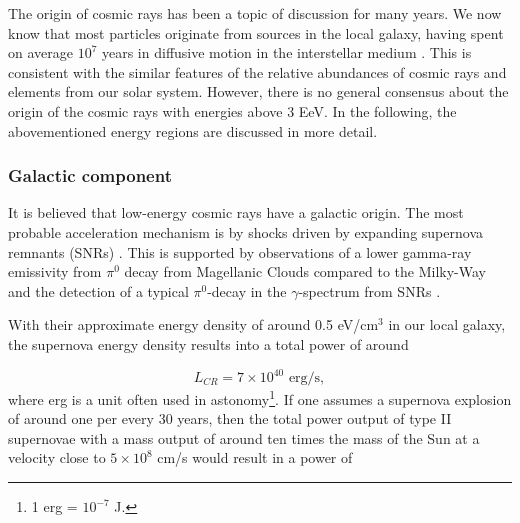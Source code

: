 The origin of cosmic rays has been a topic of discussion for many years. We now know that most particles originate from sources in the local galaxy, having spent on average $10^7$ years in diffusive motion in the interstellar medium \cite{Gaisser:2013bla}. This is consistent with the similar features of the relative abundances of cosmic rays and elements from our solar system. However, there is no general consensus about the origin of the cosmic rays with energies above 3 EeV. In the following, the abovementioned energy regions are discussed in more detail.




\subsubsection{Galactic component}
\label{subsubsec:galactic}
It is believed that low-energy cosmic rays have a galactic origin. The most probable acceleration mechanism is by shocks driven by expanding supernova remnants (SNRs) \cite{0034-4885-64-4-201}. This is supported by observations of a lower gamma-ray emissivity from $\pi^0$ decay from Magellanic Clouds compared to the Milky-Way \cite{Fermi-LAT:2010fcp} and the detection of a typical $\pi^0$-decay in the $\gamma$-spectrum from SNRs \cite{Ackermann:2013wqa}. 

With their approximate energy density of around 0.5 eV/cm$^3$ in our local galaxy, the supernova energy density results into a total power of around

\begin{equation}
L_{CR} = 7 \times 10^{40} \textrm{ erg/s},
\end{equation}
where erg is a unit often used in astonomy\footnote{1 erg = $10^{-7}$ J.}. If one assumes a supernova explosion of around one per every 30 years, then the total power output of type II supernovae with a mass output of around ten times the mass of the Sun at a velocity close to $5 \times 10^{8}$ cm/s would result in a power of

